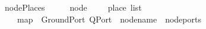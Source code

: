 \isamarkupfalse%
\ nodePlaces\ {\isacharcolon}{\isacharcolon}\ {\isachardoublequoteopen}{\isacharparenleft}\ \ \ \ node\ {\isasymRightarrow}\ {\isacharparenleft}\ \ \ place\ list{\isachardoublequoteclose}\isanewline
\ \ \ {\isachardoublequoteopen}\ \ {\isacharequal}\isanewline
\ \ \ \ map\ {\isacharparenleft}{\isasymlambda}\ GroundPort\ {\isacharparenleft}QPort\ \ {\isacharparenleft}node{\isacharunderscore}name\ \ {\isacharparenleft}node{\isacharunderscore}ports\ %

